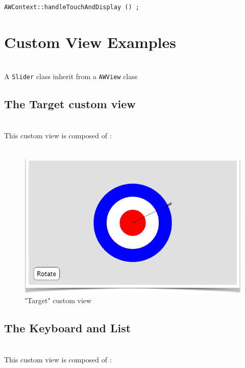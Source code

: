 \documentclass[a4paper,11pt]{extarticle}
\begin{document}
\begin{lstlisting}[language=Arduinonl]
AWContext::handleTouchAndDisplay () ;
\end{lstlisting}



\newpage
\section{Custom View Examples}

~\\ A \texttt{Slider} class inherit from a \texttt{AWView} class
~\\

\newpage
\subsection{The Target custom view}

~\\ This custom view is composed of :
~\\
~\\

\begin{figure}[htbp]
   \centering
   \includegraphics[scale=0.7]{AWFig19.png} 
   \caption{"Target" custom view}
   \label{fig:19 }
\end{figure}


\newpage
\subsection{The Keyboard and List}

~\\ This custom view is composed of :
~\\
~\\
\end{document}
